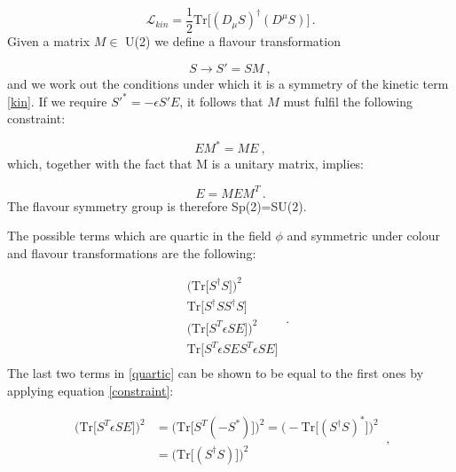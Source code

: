 \begin{equation}
\mathcal{L}_{kin} = \frac{1}{2} \mathrm{Tr} \bigl[ (D_{\mu}S)^{\dagger} (D^{\mu}S) \bigr] \, .
\label{kin}
\end{equation}
%
Given a matrix $M \in$ U(2) we define a flavour transformation

\begin{equation}
S \to S' = SM \: ,
\end{equation}
%
and we work out the conditions under which it is a symmetry of the kinetic term \ref{kin}. If we require $S'^* = - \epsilon S' E$, it follows that $M$ must fulfil the following constraint:

\begin{equation}
EM^* = ME \: ,
\end{equation}
%
which, together with the fact that M is a unitary matrix, implies:

\begin{equation}
E=MEM^T \, .
\end{equation}
%
The flavour symmetry group is therefore Sp(2)=SU(2).

The possible terms which are quartic in the field $\phi$ and symmetric under colour and flavour transformations are the following:

\begin{equation}
\begin{split}
& \bigl( \mathrm{Tr} \bigl[ S^{\dagger} S \bigr] \bigr)^2 \\
& \mathrm{Tr} \bigl[ S^{\dagger} S S^{\dagger} S\bigr] \\
&  \bigl( \mathrm{Tr} \bigl[ S^T \epsilon S E \bigr] \bigr)^2 \\
& \mathrm{Tr} \bigl[ S^T \epsilon S E S^T \epsilon S E\bigr] \\
\end{split} \: .
\label{quartic}
\end{equation}
%
The last two terms in \ref{quartic} can be shown to be equal to the first ones by applying equation \ref{constraint}:

\begin{equation}
\begin{split}
\bigl( \mathrm{Tr} \bigl[ S^T \epsilon S E \bigr] \bigr)^2  &=   \bigl( \mathrm{Tr} \bigl[ S^T (-S^*) \bigr] \bigr)^2 =  \bigl( - \mathrm{Tr} \bigl[ (S^{\dagger} S)^* \bigr] \bigr)^2 \\
 & = \bigl(  \mathrm{Tr} \bigl[ (S^{\dagger} S) \bigr] \bigr)^2 
 \end{split} \: ,
 \label{proof1}
\end{equation}

